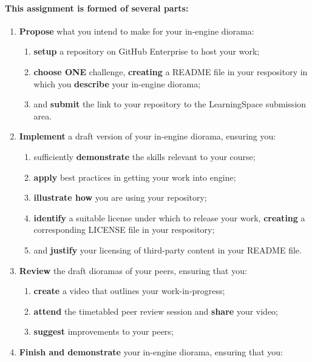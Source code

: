 \documentclass{../../fal_assignment}
\begin{document}
\paragraph{This assignment is formed of several parts:}

\begin{enumerate}
\setlength{\itemindent}{8pt}
    \item \textbf{Propose} what you intend to make for your in-engine diorama:
    	\begin{enumerate}
    		\item \textbf{setup} a repository on GitHub Enterprise to host your work;
    		\item \textbf{choose ONE} challenge, \textbf{creating} a README file in your respository in which you \textbf{describe} your in-engine diorama;
    		\item and \textbf{submit} the link to your repository to the LearningSpace submission area.
	\end{enumerate}
    \item \textbf{Implement} a draft version of your in-engine diorama, ensuring you:
    	\begin{enumerate}
    		\item sufficiently \textbf{demonstrate} the skills relevant to your course;
    		\item \textbf{apply} best practices in getting your work into engine;
    		\item \textbf{illustrate how} you are using your repository;
    		\item \textbf{identify} a suitable license under which to release your work, \textbf{creating} a corresponding LICENSE file in your respository;
    		\item and \textbf{justify} your licensing of third-party content in your README file.
	\end{enumerate}
    \item \textbf{Review} the draft dioramas of your peers, ensuring that you:
    	\begin{enumerate}
    	    	\item \textbf{create} a video that outlines your work-in-progress;
    		\item \textbf{attend} the timetabled peer review session and \textbf{share} your video;  		
      	\item \textbf{suggest} improvements to your peers;  		
	\end{enumerate}
    \item \textbf{Finish and demonstrate} your in-engine diorama, ensuring that you:

\end{enumerate}
\end{document}
